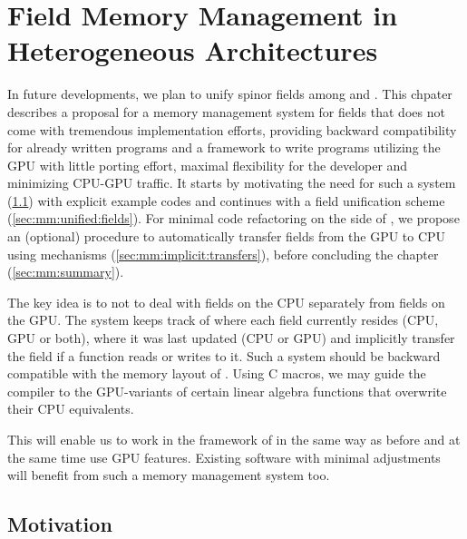 \chapter{Field Memory Management in Heterogeneous Architectures}
\label{ch:p1:memory}


In future developments, we plan to unify spinor fields among \openqxd and \quda.
This chpater describes a proposal for a memory management system for fields that does not come with tremendous implementation efforts, providing backward compatibility for already written programs and a framework to write programs utilizing the GPU with little porting effort, maximal flexibility for the developer and minimizing CPU-GPU traffic.
It starts by motivating the need for such a system (\cref{sec:mm:motivation}) with explicit example codes and continues with a field unification scheme (\cref{sec:mm:unified:fields}).
For minimal code refactoring on the side of \openqxd, we propose an (optional) procedure to automatically transfer fields from the GPU to CPU using \posix mechanisms (\cref{sec:mm:implicit:transfers}), before concluding the chapter (\cref{sec:mm:summary}).

The key idea is to not to deal with fields on the CPU separately from fields on the GPU.
The system  keeps track of where each field currently resides (CPU, GPU or both), where it was last updated (CPU or GPU) and implicitly transfer the field if a function reads or writes to it.
Such a system should be backward compatible with the memory layout of \openqxd.
Using C macros, we may guide the compiler to the GPU-variants of certain linear algebra functions that overwrite their CPU equivalents.

This will enable us to work in the framework of \openqxd in the same way as before and at the same time use GPU features. 
Existing software with minimal adjustments will benefit from such a memory management system too.

\section{Motivation}
\label{sec:mm:motivation}

